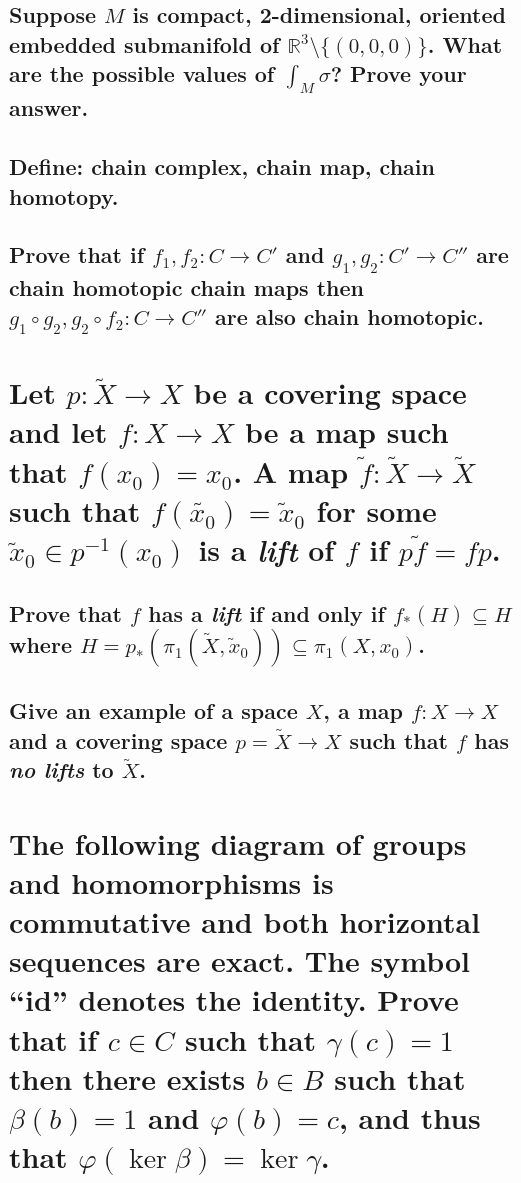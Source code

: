 \documentclass[10pt]{article}
\begin{document}
\subsection{Suppose $M$ is compact, 2-dimensional, oriented embedded submanifold of $\mathbb{R} ^3
  \setminus \{(0,0,0)\}$. What are the possible values of $\int_M \sigma$? Prove your answer.}

\advsection{}

\subsection{Define: chain complex, chain map, chain homotopy.}

\subsection{Prove that if $f_1, f_2 : C \to C'$ and $g_1, g_2 : C' \to C''$ are chain homotopic
  chain maps then $g_1 \circ g_2, g_2 \circ f_2 : C \to C''$ are also chain homotopic.}

\section{Let $p: \tilde{X} \to X$ be a covering space and let $f: X \to X$ be a map such that
  $f(x_0) = x_0$. A map $\tilde{f} : \tilde{X} \to \tilde{X}$ such that $f(\tilde{x_0}) =
  \tilde{x}_0$ for some $\tilde{x}_0 \in p^{-1} (x_0)$ is a \emph{lift} of $f$ if $p\tilde{f} =
  fp$.}

\subsection{Prove that $f$ has a \emph{lift} if and only if $f_*(H) \subseteq H$ where $H =
  p_*(\pi_1(\tilde{X}, \tilde{x}_0)) \subseteq \pi_1(X, x_0)$.}

\subsection{Give an example of a space $X$, a map $f : X \to X$ and a covering space $p = \tilde{X}
  \to X$ such that $f$ has \emph{no lifts} to $\tilde{X}$.}

\section{The following diagram of groups and homomorphisms is commutative and both horizontal
  sequences are exact. The symbol ``id'' denotes the identity. Prove that if $c \in C$ such that
  $\gamma(c) =1$ then there exists $b \in B$ such that $\beta(b) =1$ and $\varphi(b) =c$, and thus
  that $\varphi( \ker \beta) = \ker \gamma$.}
\end{document}
